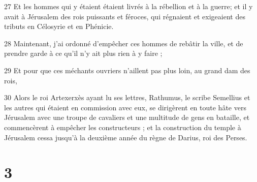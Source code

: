 \par 27 Et les hommes qui y étaient étaient livrés à la rébellion et à la guerre; et il y avait à Jérusalem des rois puissants et féroces, qui régnaient et exigeaient des tributs en Célosyrie et en Phénicie.
\par 28 Maintenant, j'ai ordonné d'empêcher ces hommes de rebâtir la ville, et de prendre garde à ce qu'il n'y ait plus rien à y faire ;
\par 29 Et pour que ces méchants ouvriers n'aillent pas plus loin, au grand dam des rois,
\par 30 Alors le roi Artexerxès ayant lu ses lettres, Rathumus, le scribe Semellius et les autres qui étaient en commission avec eux, se dirigèrent en toute hâte vers Jérusalem avec une troupe de cavaliers et une multitude de gens en bataille, et commencèrent à empêcher les constructeurs ; et la construction du temple à Jérusalem cessa jusqu'à la deuxième année du règne de Darius, roi des Perses.

\chapter{3}

